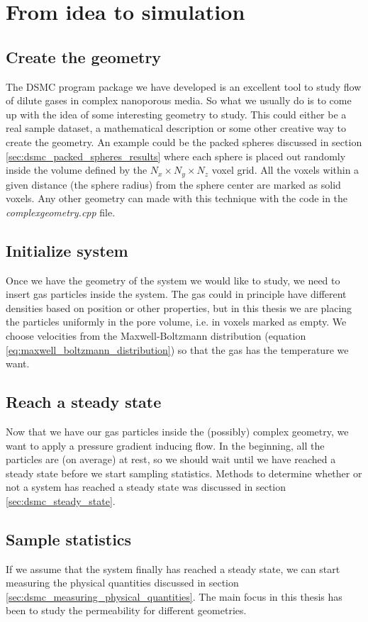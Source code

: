 \section{From idea to simulation}
\subsection{Create the geometry}
The DSMC program package we have developed is an excellent tool to study flow of dilute gases in complex nanoporous media. So what we usually do is to come up with the idea of some interesting geometry to study. This could either be a real sample dataset, a mathematical description or some other creative way to create the geometry. An example could be the packed spheres discussed in section \ref{sec:dsmc_packed_spheres_results} where each sphere is placed out randomly inside the volume defined by the $N_x\times N_y \times N_z$ voxel grid. All the voxels within a given distance (the sphere radius) from the sphere center are marked as solid voxels. Any other geometry can made with this technique with the code in the \textit{complexgeometry.cpp} file. 
\subsection{Initialize system}
Once we have the geometry of the system we would like to study, we need to insert gas particles inside the system. The gas could in principle have different densities based on position or other properties, but in this thesis we are placing the particles uniformly in the pore volume, i.e. in voxels marked as empty. We choose velocities from the Maxwell-Boltzmann distribution (equation \eqref{eq:maxwell_boltzmann_distribution}) so that the gas has the temperature we want.
\subsection{Reach a steady state}
Now that we have our gas particles inside the (possibly) complex geometry, we want to apply a pressure gradient inducing flow. In the beginning, all the particles are (on average) at rest, so we should wait until we have reached a steady state before we start sampling statistics. Methods to determine whether or not a system has reached a steady state was discussed in section \ref{sec:dsmc_steady_state}. 
\subsection{Sample statistics}
If we assume that the system finally has reached a steady state, we can start measuring the physical quantities discussed in section \ref{sec:dsmc_measuring_physical_quantities}. The main focus in this thesis has been to study the permeability for different geometries. 
